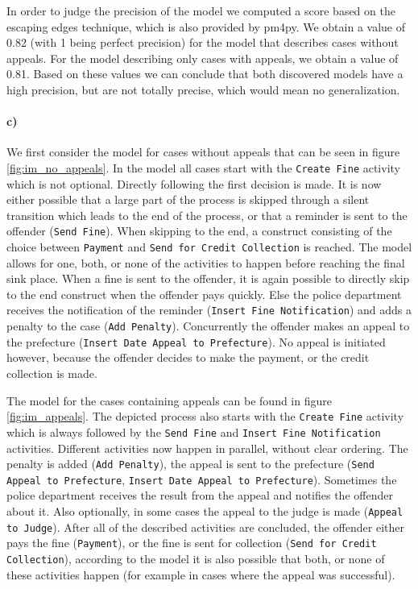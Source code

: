 \documentclass[12pt]{report}
\begin{document}
In order to judge the precision of the model we computed a score based on the escaping edges technique, which is also provided by pm4py. We obtain a value of 0.82 (with 1 being perfect precision) for the model that describes cases without appeals. For the model describing only cases with appeals, we obtain a value of 0.81. Based on these values we can conclude that both discovered models have a high precision, but are not totally precise, which would mean no generalization.

\paragraph{\textbf{c)}}

We first consider the model for cases without appeals that can be seen in figure \ref{fig:im_no_appeals}. In the model all cases start with the \texttt{Create Fine} activity which is not optional. Directly following the first decision is made. It is now either possible that a large part of the process is skipped through a silent transition which leads to the end of the process, or that a reminder is sent to the offender (\texttt{Send Fine}). When skipping to the end, a construct consisting of the choice between \texttt{Payment} and \texttt{Send for Credit Collection} is reached. The model allows for one, both, or none of the activities to happen before reaching the final sink place. When a fine is sent to the offender, it is again possible to directly skip to the end construct when the offender pays quickly. Else the police department receives the notification of the reminder (\texttt{Insert Fine Notification}) and adds a penalty to the case (\texttt{Add Penalty}). Concurrently the offender makes an appeal to the prefecture (\texttt{Insert Date Appeal to Prefecture}). No appeal is initiated however, because the offender decides to make the payment, or the credit collection is made.

The model for the cases containing appeals can be found in figure \ref{fig:im_appeals}. The depicted process also starts with the \texttt{Create Fine} activity which is always followed by the \texttt{Send Fine} and \texttt{Insert Fine Notification} activities. Different activities now happen in parallel, without clear ordering. The penalty is added (\texttt{Add Penalty}), the appeal is sent to the prefecture (\texttt{Send Appeal to Prefecture}, \texttt{Insert Date Appeal to Prefecture}). Sometimes the police department receives the result from the appeal and notifies the offender about it. Also optionally, in some cases the appeal to the judge is made (\texttt{Appeal to Judge}). After all of the described activities are concluded, the offender either pays the fine (\texttt{Payment}), or the fine is sent for collection (\texttt{Send for Credit Collection}), according to the model it is also possible that both, or none of these activities happen (for example in cases where the appeal was successful).
\end{document}
